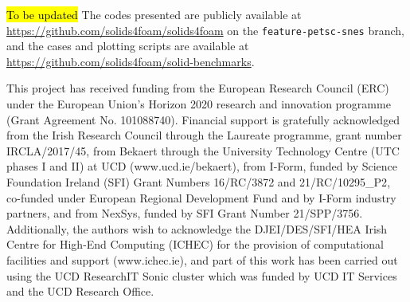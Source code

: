 \documentclass[sn-mathphys,Numbered]{sn-jnl}%
\begin{document}
\hl{To be updated}
The codes presented are publicly available at \url{https://github.com/solids4foam/solids4foam} on the \texttt{feature-petsc-snes} branch, and the cases and plotting scripts are available at \url{https://github.com/solids4foam/solid-benchmarks}.

This project has received funding from the European Research Council (ERC) under the European Union’s Horizon 2020 research and innovation programme (Grant Agreement No. 101088740).
Financial support is gratefully acknowledged from the Irish Research Council
through the Laureate programme, grant number IRCLA/2017/45, from Bekaert through
the University Technology Centre (UTC phases I and II) at UCD
(www.ucd.ie/bekaert), from I-Form, funded by Science Foundation Ireland (SFI)
Grant Numbers {16/RC/3872} and {21/RC/10295\_P2}, co-funded under European Regional Development Fund and by I-Form industry partners, and from NexSys, funded by SFI Grant Number 21/SPP/3756.
Additionally, the authors wish to acknowledge the DJEI/DES/SFI/HEA Irish Centre for High-End Computing (ICHEC) for the provision of computational facilities and support (www.ichec.ie), and part of this work has been carried out using the UCD ResearchIT Sonic cluster which was funded by UCD IT Services and the UCD Research Office.


\newpage





\end{document}
